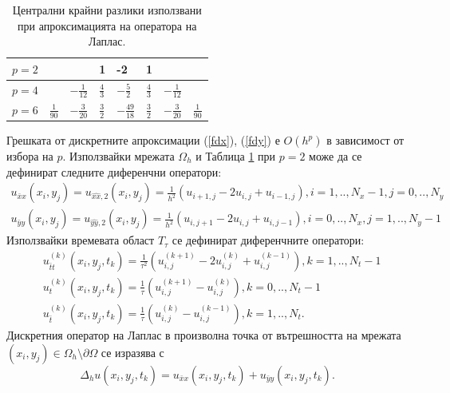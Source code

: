 \documentclass{article}
\newcommand{\rf}[1]{(\ref{#1})}
\begin{document}
\begin{table}[ht]
\centering
\small
		\begin{tabular}{||c|l|l|l|l|l|l|l||}
			\hline
			\hline
            $p=2$          &          &                                 &     1      &   -2   &    1    &    &        \\
   			\hline 
			\hline 
           $p=4$          &                            &   $-\frac{1}{12}$     &     $\frac{4}{3}$      &   $-\frac{5}{2} $     &    $\frac{4}{3}$    &  $-\frac{1}{12}$   &        \\
	   \hline
			\hline 
            $p=6$        &   $\frac{1}{90}$       &     $-\frac{3}{20}$     &    $\frac{3}{2}$      &    $-\frac{49}{18}$   &    $\frac{3}{2}$    & $-\frac{3}{20}$    &    $\frac{1}{90}$       \\
	   \hline
			\hline 
		\end{tabular}
	\caption{Централни крайни разлики използвани при апроксимацията на оператора на Лаплас.}
	\label{table:A00}
\end{table}
Грешката от дискретните апроксимации \rf{fdx}, \rf{fdy} е $O(h^p)$ в зависимост от избора на $p$. Използвайки мрежата $\Omega_h$ и Таблица \ref{table:A00} при $p=2$ може да се дефинират следните диференчни оператори:
\begin{align}
u_{\bar{x}x}(x_i,y_j) = u_{\widehat{xx},2}(x_i,y_j) = \frac{1}{h^2}(u_{i+1,j} - 2u_{i,j} + u_{i-1,j}), i = 1,.., N_x-1, j = 0,.., N_y \nonumber\\
u_{\bar{y}y}(x_i,y_j) = u_{\widehat{yy},2}(x_i,y_j) = \frac{1}{h^2}(u_{i,j+1} - 2u_{i,j} + u_{i,j-1}), i = 0,.., N_x, j = 1,.., N_y-1 \nonumber
\end{align}
Използвайки времевата област $T_{\tau}$ се дефинират диференчните оператори:
\begin{align}
& u^{(k)}_{\bar{t}t}(x_i,y_j,t_k) = \frac{1}{\tau^2}(u_{i,j}^{(k+1)} - 2u_{i,j}^{(k)} + u_{i,j}^{(k-1)}), k = 1,..,N_t-1 \nonumber\\
& u^{(k)}_{t}(x_i,y_j,t_k) =  \frac{1}{\tau}(u_{i,j}^{(k+1)} - u_{i,j}^{(k)}), k = 0,.., N_{t}-1 \nonumber\\
& u^{(k)}_{\bar{t}}(x_i,y_j,t_k) =  \frac{1}{\tau}(u_{i,j}^{(k)} - u_{i,j}^{(k-1)}), k = 1,.., N_{t} \nonumber.
\end{align}
Дискретния оператор на Лаплас в произволна точка от вътрешността на мрежата $(x_i, y_j) \in \Omega_h \setminus \partial\Omega$ се изразява с 
$$\Delta_h u(x_i, y_j, t_k) =  u_{\bar{x}x}(x_i, y_j, t_k) + u_{\bar{y}y}(x_i, y_j, t_k).$$
 
\end{document}
